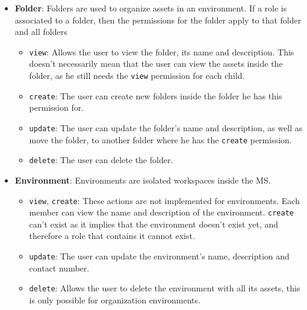 \begin{itemize}
	\item \textbf{Folder}: Folders are used to organize assets in an environment.
	      If a role is associated to a folder, then the permissions for the folder apply to that
	      folder and all folders
	      \begin{itemize}
		      \item \lstinline{view}: Allows the user to view the folder, its name and description.
		            This doesn't necessarily mean that the user can view the assets inside the folder,
		            as he still needs the \lstinline{view} permission for each child.
		      \item \lstinline{create}: The user can create new folders inside the folder he has this
		            permission for.
		      \item \lstinline{update}: The user can update the folder's name and description, as
		            well as move the folder, to another folder where he has the \lstinline{create}
		            permission.

		      \item \lstinline[keywords={}]{delete}: The user can delete the folder.
	      \end{itemize}
	\item \textbf{Environment}: Environments are isolated workspaces inside the MS.
    \begin{itemize}
		      \item \lstinline{view}, \lstinline{create}: These actions are not implemented for
		            environments.
		            Each member can view the name and description of the environment.
		            \lstinline{create} can't exist as it implies that the environment doesn't exist
		            yet, and therefore a role that contains it cannot exist.
		      \item \lstinline{update}: The user can update the environment's name, description
		            and contact number.
            \item \lstinline[keywords={}]{delete}: Allows the user to delete the environment with all its
		            assets, this is only possible for organization environments.
	      \end{itemize}
\end{itemize}


